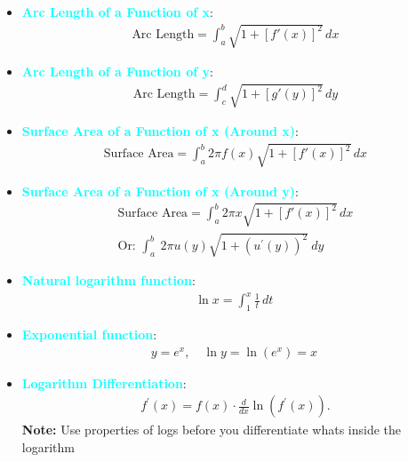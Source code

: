 \documentclass{report}
\begin{document}
\begin{itemize}
        \item \textbf{\textcolor{cyan}{Arc Length of a Function of x}}:
            \begin{align}
                \text{Arc Length} = \int_{a}^{b} \sqrt{1 + [f'(x)]^2} \, dx
            \end{align}

        \item \textbf{\textcolor{cyan}{Arc Length of a Function of y}}:
            \begin{align}
                \text{Arc Length} = \int_{c}^{d} \sqrt{1 + [g'(y)]^2} \, dy
            \end{align}

        \item \textbf{\textcolor{cyan}{Surface Area of a Function of x (Around x)}}:
            \begin{align}
                \text{Surface Area} = \int_{a}^{b} 2\pi f(x) \sqrt{1 + [f'(x)]^2} \, dx
            \end{align}

        \item \textbf{\textcolor{cyan}{Surface Area of a Function of x (Around y)}}:
            \begin{align}
                \text{Surface Area} = \int_{a}^{b} 2\pi x \sqrt{1 + [f'(x)]^2} \, dx \\
                \text{Or: } \int_{a}^{b}\ 2\pi u(y)\sqrt{1+(u^{\prime}(y))^{2}}\ dy
            \end{align}

        \item \textbf{\textcolor{cyan}{Natural logarithm function}}:
            \begin{align}
                \ln x = \int_{1}^{x} \frac{1}{t} \, dt\
            \end{align}

        \item \textbf{\textcolor{cyan}{Exponential function}}:
            \begin{align}
                y = e^x, \quad \ln y = \ln(e^x) = x\
            \end{align}

        \item \textbf{\textcolor{cyan}{Logarithm Differentiation}}:
            \begin{align*}
                f^{\prime}(x) = f(x) \cdot \frac{d}{dx}\ln{\left(f^{\prime}(x)\right)}
            .\end{align*}
            \textbf{Note:} Use properties of logs before you differentiate whats inside the logarithm


\end{itemize}
\end{document}
